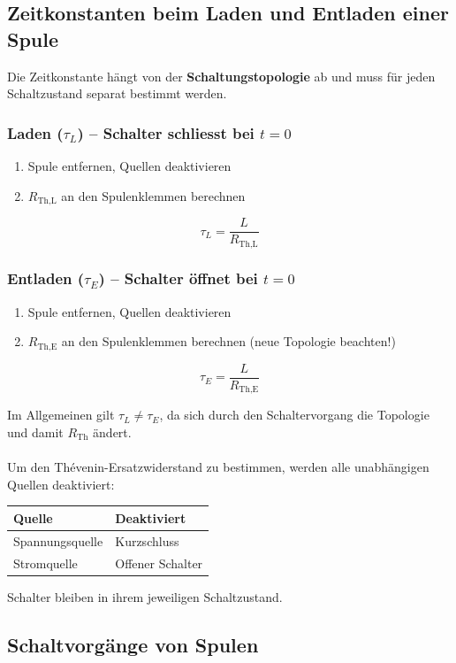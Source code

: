 \documentclass[a4paper,12pt]{article}
\begin{document}
	\subsection{Zeitkonstanten beim Laden und Entladen einer Spule}
	
	Die Zeitkonstante hängt von der \textbf{Schaltungstopologie} ab und muss 
	für jeden Schaltzustand separat bestimmt werden.
	
	\subsubsection*{Laden ($\tau_L$) -- Schalter schliesst bei $t = 0$}
	\begin{enumerate}
		\item Spule entfernen, Quellen deaktivieren
		\item $R_{\text{Th,L}}$ an den Spulenklemmen berechnen
	\end{enumerate}
	\[
	\tau_L = \frac{L}{R_{\text{Th,L}}}
	\]
	
	\subsubsection*{Entladen ($\tau_E$) -- Schalter öffnet bei $t = 0$}
	\begin{enumerate}
		\item Spule entfernen, Quellen deaktivieren
		\item $R_{\text{Th,E}}$ an den Spulenklemmen berechnen
		(neue Topologie beachten!)
	\end{enumerate}
	\[
	\tau_E = \frac{L}{R_{\text{Th,E}}}
	\]
	
	\noindent Im Allgemeinen gilt $\tau_L \neq \tau_E$, da sich durch den 
	Schaltervorgang die Topologie und damit $R_{\text{Th}}$ ändert.\\
	\\
	\noindent Um den Thévenin-Ersatzwiderstand zu bestimmen, werden alle 
	unabhängigen Quellen deaktiviert:
	
	\begin{tabular}{l l}
		\hline
		\textbf{Quelle} & \textbf{Deaktiviert} \\
		\hline
		Spannungsquelle & Kurzschluss \\
		Stromquelle     & Offener Schalter \\
		\hline
	\end{tabular}
	
	\noindent Schalter bleiben in ihrem jeweiligen Schaltzustand.
	
	\subsection{Schaltvorgänge von Spulen}
	
\end{document}
